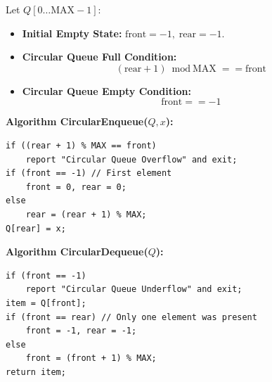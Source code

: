 \documentclass[12pt,a4paper]{article}
\begin{document}
\begin{tcolorbox}[defbox, title={\textbf{Circular Queue Boundary States and Algorithms}}]
Let $Q[0 \dots \text{MAX}-1]$:
\begin{itemize}[leftmargin=*, itemsep=3pt]
  \item \textbf{Initial Empty State:} $\text{front} = -1, \; \text{rear} = -1$.
  \item \textbf{Circular Queue Full Condition:}
  \begin{equation}
    (\text{rear} + 1) \bmod \text{MAX} == \text{front}
  \end{equation}
  \item \textbf{Circular Queue Empty Condition:}
  \begin{equation}
    \text{front} == -1
  \end{equation}
\end{itemize}
\par\vspace{2pt}\noindent
\textbf{Algorithm CircularEnqueue($Q, x$):}
\begin{verbatim}
if ((rear + 1) % MAX == front)
    report "Circular Queue Overflow" and exit;
if (front == -1) // First element
    front = 0, rear = 0;
else
    rear = (rear + 1) % MAX;
Q[rear] = x;
\end{verbatim}

\textbf{Algorithm CircularDequeue($Q$):}
\begin{verbatim}
if (front == -1)
    report "Circular Queue Underflow" and exit;
item = Q[front];
if (front == rear) // Only one element was present
    front = -1, rear = -1;
else
    front = (front + 1) % MAX;
return item;
\end{verbatim}
\end{tcolorbox}

\begin{tcolorbox}[tikzbox, title={\textbf{Ring Representation of Circular Queue ($MAX=8$)}}]
\centering
{}
\end{tcolorbox}
\end{document}
